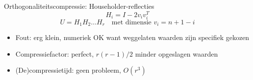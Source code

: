 \documentclass[t,12pt,dutch
\ifx\beamermode\undefined\else,\beamermode\fi
]{beamer}
\begin{document}

\begin{frame}{Orthogonaliteitscompressie: Householder-reflecties}
\[
H_i = I - 2 v_i v_i^T
\]
\[
U = H_1 H_2 \dots H_r \quad \text{met dimensie } v_i = n + 1 - i
\]
\begin{itemize}
\item Fout: erg klein, numeriek OK want weggelaten waarden zijn specifiek gekozen
\item Compressiefactor: perfect, $r (r - 1)/2$ minder opgeslagen waarden
\item (De)compressietijd: geen probleem, $O(r^3)$
\end{itemize}
\end{frame}
\end{document}

